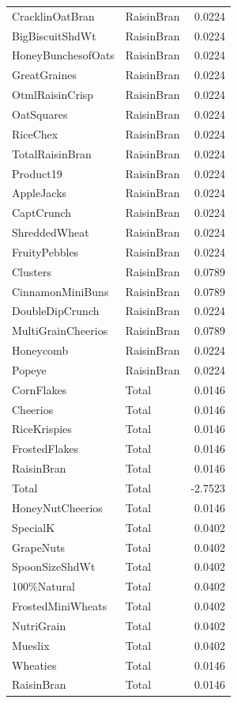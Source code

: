 \begin{longtable}{llr}
CracklinOatBran & RaisinBran & 0.0224 \\
BigBiscuitShdWt & RaisinBran & 0.0224 \\
HoneyBunchesofOats & RaisinBran & 0.0224 \\
GreatGraines & RaisinBran & 0.0224 \\
OtmlRaisinCrisp & RaisinBran & 0.0224 \\
OatSquares & RaisinBran & 0.0224 \\
RiceChex & RaisinBran & 0.0224 \\
TotalRaisinBran & RaisinBran & 0.0224 \\
Product19 & RaisinBran & 0.0224 \\
AppleJacks & RaisinBran & 0.0224 \\
CaptCrunch & RaisinBran & 0.0224 \\
ShreddedWheat & RaisinBran & 0.0224 \\
FruityPebbles & RaisinBran & 0.0224 \\
Clusters & RaisinBran & 0.0789 \\
CinnamonMiniBuns & RaisinBran & 0.0789 \\
DoubleDipCrunch & RaisinBran & 0.0224 \\
MultiGrainCheerios & RaisinBran & 0.0789 \\
Honeycomb & RaisinBran & 0.0224 \\
Popeye & RaisinBran & 0.0224 \\
CornFlakes & Total & 0.0146 \\
Cheerios & Total & 0.0146 \\
RiceKrispies & Total & 0.0146 \\
FrostedFlakes & Total & 0.0146 \\
RaisinBran & Total & 0.0146 \\
Total & Total & -2.7523 \\
HoneyNutCheerios & Total & 0.0146 \\
SpecialK & Total & 0.0402 \\
GrapeNuts & Total & 0.0402 \\
SpoonSizeShdWt & Total & 0.0402 \\
100\%Natural & Total & 0.0402 \\
FrostedMiniWheats & Total & 0.0402 \\
NutriGrain & Total & 0.0402 \\
Mueslix & Total & 0.0402 \\
Wheaties & Total & 0.0146 \\
RaisinBran & Total & 0.0146 \\

\end{longtable}
